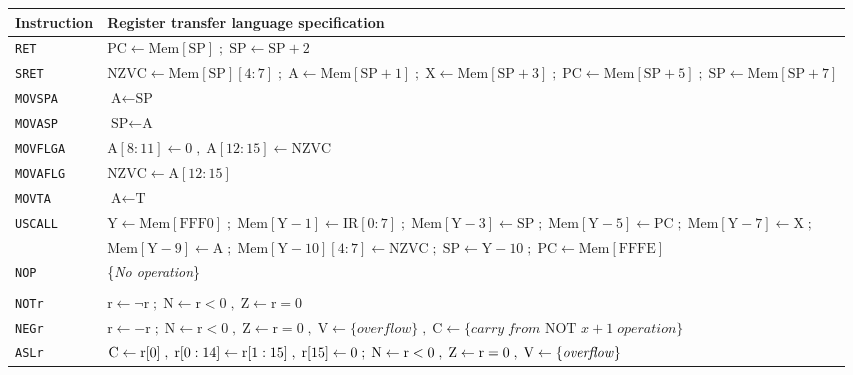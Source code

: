 \documentclass[10pt,fleqn]{book}
\begin{document}
\begin{tabular}{ l l }
\toprule
Instruction & Register transfer language specification\\
\midrule

\verb|RET|     & $\textrm{PC}\leftarrow \textrm{Mem}[\textrm{SP}]\; ; \;\textrm{SP}\leftarrow\textrm{SP}+2$ \\
\verb|SRET|    & $\textrm{NZVC}\leftarrow\textrm{Mem}[\textrm{SP}][ 4:7] \; ; \; \textrm{A}\leftarrow\textrm{Mem}[\textrm{SP}+1] \; ; \; \textrm{X}\leftarrow\textrm{Mem}[\textrm{SP}+3] \; ; \; \textrm{PC}\leftarrow\textrm{Mem}[\textrm{SP}+5] \; ; \; \textrm{SP}\leftarrow\textrm{Mem}[\textrm{SP}+7]$\\
\verb|MOVSPA|  & $\textrm{A}\leftarrow \textrm{SP}$\\
\verb|MOVASP|  & $\textrm{SP}\leftarrow \textrm{A}$\\
\verb|MOVFLGA| & $\textrm{A}[ 8:11]\leftarrow 0 \; , \; \textrm{A}[ 12:15]\leftarrow \textrm{NZVC}$\\
\verb|MOVAFLG| & $\textrm{NZVC}\leftarrow \textrm{A}[ 12:15]$\\
\verb|MOVTA|   & $\textrm{A}\leftarrow \textrm{T}$\\
\verb|USCALL|   & $\textrm{Y}\leftarrow\textrm{Mem}[\textrm{FFF0}] \; ; \;
\textrm{Mem}[\textrm{Y}-1]\leftarrow\textrm{IR}[ 0:7] \; ; \;
\textrm{Mem}[\textrm{Y}-3]\leftarrow\textrm{SP} \; ; \;
\textrm{Mem}[\textrm{Y}-5]\leftarrow\textrm{PC} \; ; \;
\textrm{Mem}[\textrm{Y}-7]\leftarrow\textrm{X} \; ; \;$\\
 & 
$\textrm{Mem}[\textrm{Y}-9]\leftarrow\textrm{A} \; ; \;
\textrm{Mem}[\textrm{Y}-10][ 4:7]\leftarrow\textrm{NZVC} \; ; \;
\textrm{SP}\leftarrow\textrm{Y}-10 \; ; \;
\textrm{PC}\leftarrow\textrm{Mem}[\textrm{FFFE}]$\\
\verb|NOP|     & \{\textit{No operation}\}\\
\\
\verb|NOTr|    & $\textrm{r}\leftarrow \neg\textrm{r}\; ; \;\textrm{N}\leftarrow\textrm{r}<0 \; , \; \textrm{Z}\leftarrow\textrm{r}=0$\\
\verb|NEGr|    & $\textrm{r}\leftarrow -\textrm{r}\; ; \;\textrm{N}\leftarrow\textrm{r}<0 \; , \; \textrm{Z}\leftarrow\textrm{r}=0 \; , \; \textrm{V}\leftarrow \{\mathit{overflow}\} \; , \; \textrm{C}\leftarrow \{\mathit{carry\; from}\textrm{ NOT }x+1\; \mathit{operation}\}$\\
\verb|ASLr|    & $\textrm{C}\leftarrow \textrm{r}[ 0] \; , \; \textrm{r}[ 0:14]\leftarrow\textrm{r}[ 1:15] \; , \;\textrm{r}[ 15]\leftarrow\textrm0 \; ; \; \textrm{N}\leftarrow\textrm{r}<0 \; , \; \textrm{Z}\leftarrow\textrm{r}=0 \; , \; \textrm{V}\leftarrow \{\mathit{overflow}\}$\\

\end{tabular}
\end{document}
